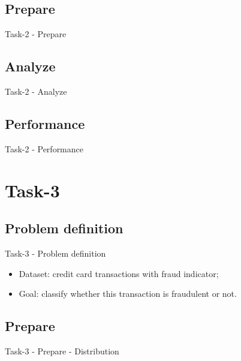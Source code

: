 \documentclass{beamer}
\begin{document}
\subsection{Prepare}

\begin{frame}{Task-2 - Prepare}

\end{frame}

\subsection{Analyze}

\begin{frame}{Task-2 - Analyze}

\end{frame}

\subsection{Performance}

\begin{frame}{Task-2 - Performance}

\end{frame}

\section{Task-3}

\subsection{Problem definition}

\begin{frame}{Task-3 - Problem definition}
  \begin{itemize}
    \item Dataset: credit card transactions with fraud indicator;
    \item Goal: classify whether this transaction is fraudulent or not.
  \end{itemize}
\end{frame}

\subsection{Prepare}

\begin{frame}{Task-3 - Prepare - Distribution}


\end{frame}
\end{document}
